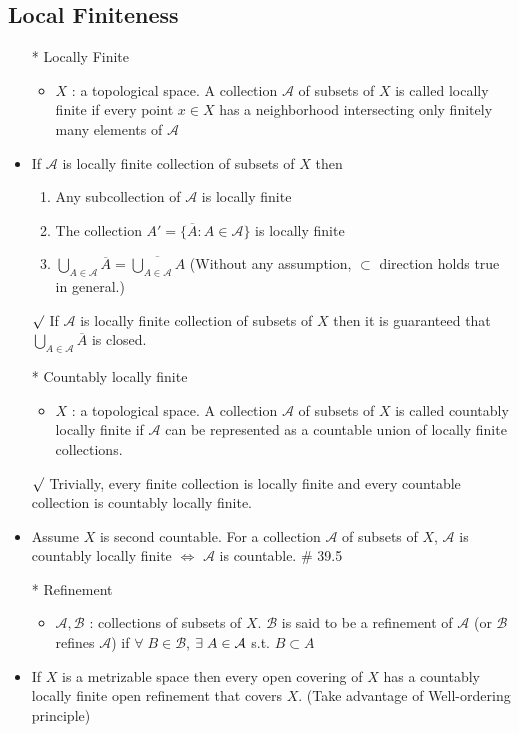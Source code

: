\documentclass[12pt]{article}
\newcommand{\rmk}{$\surd$}
\newcommand{\spone}{\hspace{0.1cm}}
\newcommand{\A}{\mathcal{A}}
\newcommand{\B}{\mathcal{B}}
\newcommand{\cl}{\overline}
\newcommand{\exist}{\exists\spone}
\begin{document}
\subsection{Local Finiteness}
\smallskip
\begin{itemize}
	\item[*] Locally Finite
	\begin{itemize}
		\item $X$ : a topological space. A collection $\A$ of subsets of $X$ is called locally finite if every point $x\in X$ has a neighborhood intersecting only finitely many elements of $\A$ 
	\end{itemize}
	\item If $\A$ is locally finite collection of subsets of $X$ then 
	\begin{enumerate}
		\item Any subcollection of $\A$ is locally finite
		\item The collection $A'=\{\cl{A}:A\in \A\}$ is locally finite
		\item $\bigcup_{A\in \A}\cl{A}=\cl{\bigcup_{A\in \A}A}$ \; (Without any assumption, $\subset$ direction holds true in general.)
	\end{enumerate}
	\item[\rmk] If $\A$ is locally finite collection of subsets of $X$ then it is guaranteed that $\bigcup_{A\in \A}\cl{A}$ is closed.
	\item[*] Countably locally finite 
	\begin{itemize}
		\item $X$ : a topological space. A collection $\A$ of subsets of $X$ is called countably locally finite if $\A$ can be represented as a countable union of locally finite collections.
	\end{itemize}
	\item[\rmk] Trivially, every finite collection is locally finite and every countable collection is countably locally finite.
	\item Assume $X$ is second countable. For a collection $\A$ of subsets of $X$, $\A$ is countably locally finite $\Leftrightarrow$ $\A$ is countable. \quad \# 39.5
	\item[*] Refinement
	\begin{itemize}
		\item $\A, \B$ : collections of subsets of $X$. $\B$ is said to be a refinement of $\A$ (or $\B$ refines $\A$) if $\forall \; B\in \B$, $\exist A\in \A$ s.t. $B\subset A$
	\end{itemize} 
	\item If $X$ is a metrizable space then every open covering of $X$ has a countably locally finite open refinement that covers $X$. \quad (Take advantage of Well-ordering principle)
\end{itemize}
\bigskip
\end{document}
